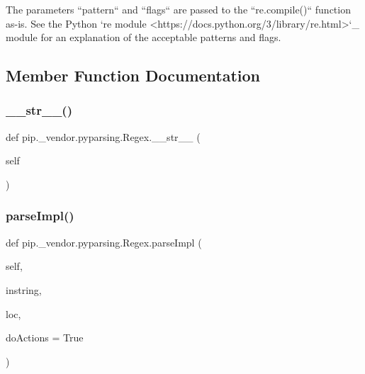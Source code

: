 \begin{DoxyVerb}The parameters ``pattern`` and ``flags`` are passed
to the ``re.compile()`` function as-is. See the Python
`re module <https://docs.python.org/3/library/re.html>`_ module for an
explanation of the acceptable patterns and flags.
\end{DoxyVerb}
 

\subsection{Member Function Documentation}
\mbox{\label{classpip_1_1__vendor_1_1pyparsing_1_1Regex_aeb871b63e1311123d401c41d2d08bcc0}} 
\subsubsection{\texorpdfstring{\+\_\+\+\_\+str\+\_\+\+\_\+()}{\_\_str\_\_()}}
{\footnotesize\ttfamily def pip.\+\_\+vendor.\+pyparsing.\+Regex.\+\_\+\+\_\+str\+\_\+\+\_\+ (\begin{DoxyParamCaption}\item[{}]{self }\end{DoxyParamCaption})}

\mbox{\label{classpip_1_1__vendor_1_1pyparsing_1_1Regex_a55512fee467cee04f8e69269117e4e44}} 
\subsubsection{\texorpdfstring{parse\+Impl()}{parseImpl()}}
{\footnotesize\ttfamily def pip.\+\_\+vendor.\+pyparsing.\+Regex.\+parse\+Impl (\begin{DoxyParamCaption}\item[{}]{self,  }\item[{}]{instring,  }\item[{}]{loc,  }\item[{}]{do\+Actions = {\ttfamily True} }\end{DoxyParamCaption})}

